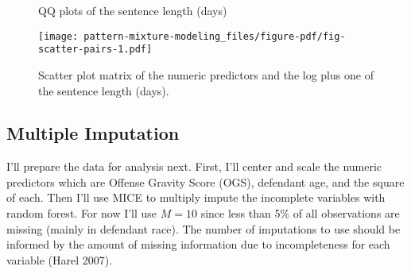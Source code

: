 \documentclass[
  letterpaper,
  DIV=11,
  numbers=noendperiod]{scrartcl}
\begin{document}
\begin{figure}

\begin{minipage}[t]{0.50\linewidth}

{\centering 


}

\end{minipage}%
%
\begin{minipage}[t]{0.50\linewidth}

{\centering 


}

\end{minipage}%

\caption{\label{fig-sen-len-qq}QQ plots of the sentence length (days)}

\end{figure}

\begin{figure}

{\centering \texttt{[image: pattern-mixture-modeling\_files/figure-pdf/fig-scatter-pairs-1.pdf]}

}

\caption{\label{fig-scatter-pairs}Scatter plot matrix of the numeric
predictors and the log plus one of the sentence length (days).}

\end{figure}

\hypertarget{multiple-imputation}{%
\subsection{Multiple Imputation}\label{multiple-imputation}}

I'll prepare the data for analysis next. First, I'll center and scale
the numeric predictors which are Offense Gravity Score (OGS), defendant
age, and the square of each. Then I'll use MICE to multiply impute the
incomplete variables with random forest. For now I'll use \(M = 10\)
since less than 5\% of all observations are missing (mainly in defendant
race). The number of imputations to use should be informed by the amount
of missing information due to incompleteness for each variable (Harel
2007).
\end{document}
